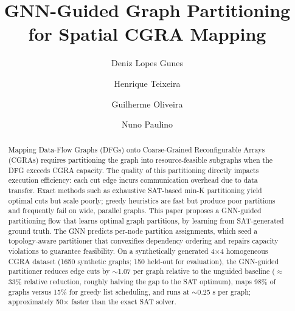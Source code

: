 \documentclass[runningheads]{llncs}
\begin{document}
\title{GNN-Guided Graph Partitioning for Spatial CGRA Mapping}
%
\author{Deniz Lopes Gunes \and
Henrique Teixeira \and
Guilherme Oliveira \and
Nuno Paulino}
%
%
%
\maketitle              %

\begin{abstract}
Mapping Data-Flow Graphs (DFGs) onto Coarse-Grained Reconfigurable Arrays (CGRAs) requires partitioning the graph into resource-feasible subgraphs when the DFG exceeds CGRA capacity. The quality of this partitioning directly impacts execution efficiency: each cut edge incurs communication overhead due to data transfer. Exact methods such as exhaustive SAT-based min-K partitioning yield optimal cuts but scale poorly; greedy heuristics are fast but produce poor partitions and frequently fail on wide, parallel graphs.
%
This paper proposes a GNN-guided partitioning flow that learns optimal 
graph partitions, by learning
from SAT-generated ground truth. 
The GNN predicts per-node partition assignments, which seed a topology-aware partitioner that convexifies dependency ordering and repairs capacity violations to guarantee feasibility. On a synthetically generated 4×4 homogeneous CGRA dataset (1650 synthetic graphs; 150 held-out for evaluation), the GNN-guided partitioner reduces edge cuts by $\sim$1.07 per graph relative to the unguided baseline ($\approx$33\% relative reduction, roughly halving the gap to the SAT optimum), maps 98\% of graphs versus 15\% for greedy list scheduling, and runs at $\sim$0.25 s per graph; approximately 50× faster than the exact SAT solver.
\end{abstract}
\end{document}
